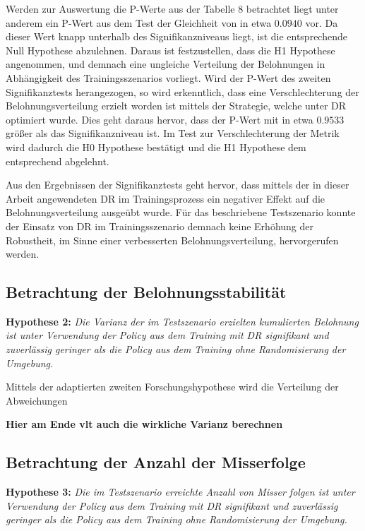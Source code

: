 Werden zur Auswertung die P-Werte aus der Tabelle 8 betrachtet liegt unter anderem ein P-Wert aus dem Test der Gleichheit von in etwa $0.0940$ vor.
Da dieser Wert knapp unterhalb des Signifikanzniveaus liegt, ist die entsprechende Null Hypothese abzulehnen.
Daraus ist festzustellen, dass die H1 Hypothese angenommen, und demnach eine ungleiche Verteilung der Belohnungen in Abhängigkeit des Trainingsszenarios vorliegt.
Wird der P-Wert des zweiten Signifikanztests herangezogen, so wird erkenntlich, dass eine Verschlechterung der Belohnungsverteilung erzielt worden ist mittels der Strategie, welche unter DR optimiert wurde.
Dies geht daraus hervor, dass der P-Wert mit in etwa $0.9533$ größer als das Signifikanzniveau ist.
Im Test zur Verschlechterung der Metrik wird dadurch die H0 Hypothese bestätigt und die H1 Hypothese dem entsprechend abgelehnt.

Aus den Ergebnissen der Signifikanztests geht hervor, dass mittels der in dieser Arbeit angewendeten DR im Trainingsprozess ein negativer Effekt auf die Belohnungsverteilung ausgeübt wurde.
Für das beschriebene Testszenario konnte der Einsatz von DR im Trainingsszenario demnach keine Erhöhung der Robustheit, im Sinne einer verbesserten Belohnungsverteilung, hervorgerufen werden.

\subsection{Betrachtung der Belohnungsstabilität}

\textbf{Hypothese 2:}
\textit{Die Varianz der im Testszenario erzielten kumulierten Belohnung ist unter Verwendung der Policy aus dem Training mit DR signifikant und zuverlässig geringer als die Policy aus dem Training ohne Randomisierung der Umgebung.}

Mittels der adaptierten zweiten Forschungshypothese wird die Verteilung der Abweichungen 


\textbf{Hier am Ende vlt auch die wirkliche Varianz berechnen}

\subsection{Betrachtung der Anzahl der Misserfolge}

\textbf{Hypothese 3:}
\textit{Die im Testszenario erreichte Anzahl von Misser folgen ist unter Verwendung der Policy aus dem Training mit DR signifikant und zuverlässig geringer als die Policy aus dem Training ohne Randomisierung der Umgebung.}

